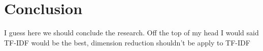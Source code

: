 \chapter{Conclusion}
I guess here we should conclude the research. Off the top of my head I would said TF-IDF would be the best, dimension reduction shouldn't be apply to TF-IDF